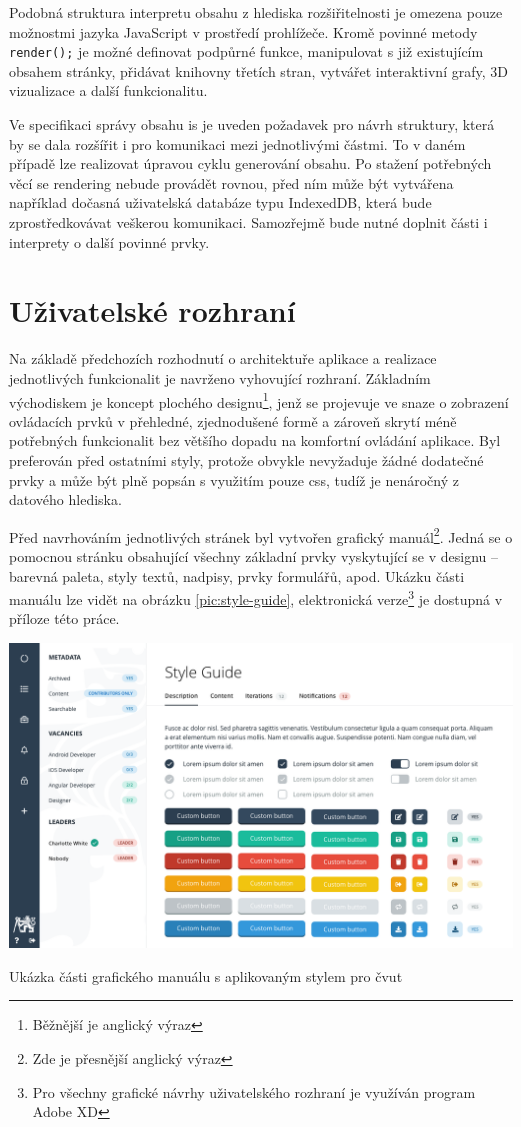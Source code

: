 Podobná struktura interpretu obsahu z hlediska rozšiřitelnosti je omezena pouze možnostmi jazyka JavaScript v prostředí prohlížeče. Kromě povinné metody \texttt{render();} je možné definovat podpůrné funkce, manipulovat s již existujícím obsahem stránky, přidávat knihovny třetích stran, vytvářet interaktivní grafy, 3D vizualizace a další funkcionalitu.

Ve specifikaci správy obsahu \gls{is} je uveden požadavek pro návrh struktury, která by se dala rozšířit i pro komunikaci mezi jednotlivými částmi. To v daném případě lze realizovat úpravou cyklu generování obsahu. Po stažení potřebných věcí se rendering nebude provádět rovnou, před ním může být vytvářena například dočasná uživatelská databáze typu IndexedDB, která bude zprostředkovávat veškerou komunikaci. Samozřejmě bude nutné doplnit části i interprety o další povinné prvky.



\clearpage
\section{Uživatelské rozhraní}

Na základě předchozích rozhodnutí o architektuře aplikace a realizace jednotlivých funkcionalit je navrženo vyhovující rozhraní. Základním východiskem je koncept plochého designu\footnote{Běžnější je anglický výraz }, jenž se projevuje ve snaze o zobrazení ovládacích prvků v přehledné, zjednodušené formě a zároveň skrytí méně potřebných funkcionalit bez většího dopadu na komfortní ovládání aplikace. Byl preferován před ostatními styly, protože obvykle nevyžaduje žádné dodatečné prvky a může být plně popsán s využitím pouze \gls{css}, tudíž je nenáročný z datového hlediska.

Před navrhováním jednotlivých stránek byl vytvořen grafický manuál\footnote{Zde je přesnější anglický výraz }. Jedná se o pomocnou stránku obsahující všechny základní prvky vyskytující se v designu -- barevná paleta, styly textů, nadpisy, prvky formulářů, apod. Ukázku části manuálu lze vidět na obrázku \ref{pic:style-guide}, elektronická verze\footnote{Pro všechny grafické návrhy uživatelského rozhraní je využíván program Adobe XD} je dostupná v příloze této práce.

\begin{fig:illustration}
   \includegraphics[width=1\textwidth]{images/style-guide.png}
   \caption{Ukázka části grafického manuálu s aplikovaným stylem pro \gls{čvut}}\label{pic:style-guide}
\end{fig:illustration}